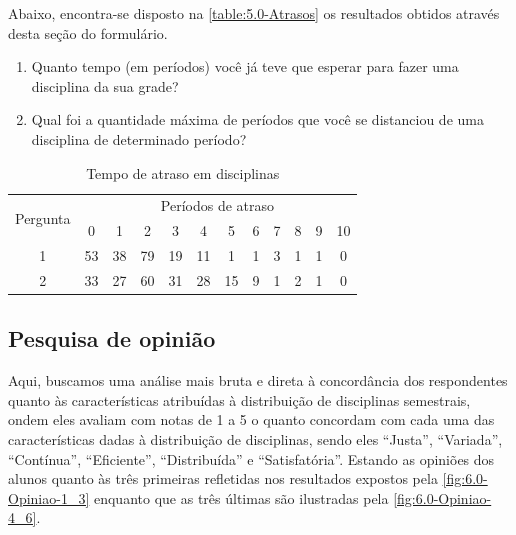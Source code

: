 Abaixo, encontra-se disposto na \autoref{table:5.0-Atrasos} os resultados obtidos através desta seção do formulário.

\begin{enumerate}
  \item Quanto tempo (em períodos) você já teve que esperar para fazer uma disciplina da sua grade?
  \item Qual foi a quantidade máxima de períodos que você se distanciou de uma disciplina de determinado período?
\end{enumerate}

\begin{table}[htbp]\centering
  \caption{Tempo de atraso em disciplinas}
  \label{table:5.0-Atrasos}
  \begin{tabular}{| c | c c c c c c c c c c c |}
    \hline
    \multicolumn{1}{|c|}{\multirow{2}{*}{Pergunta}} &
    \multicolumn{11}{c|}{Períodos de atraso}                                                          \\
    \multicolumn{1}{|c|}{}                          &
    \multicolumn{1}{c|}{0}                          &
    \multicolumn{1}{c|}{1}                          &
    \multicolumn{1}{c|}{2}                          &
    \multicolumn{1}{c|}{3}                          &
    \multicolumn{1}{c|}{4}                          &
    \multicolumn{1}{c|}{5}                          &
    \multicolumn{1}{c|}{6}                          &
    \multicolumn{1}{c|}{7}                          &
    \multicolumn{1}{c|}{8}                          &
    \multicolumn{1}{c|}{9}                          &
    \multicolumn{1}{|c|}{10}
    \\
    \hline
    1                                               & 53 & 38 & 79 & 19 & 11 & 1  & 1 & 3 & 1 & 1 & 0 \\
    2                                               & 33 & 27 & 60 & 31 & 28 & 15 & 9 & 1 & 2 & 1 & 0 \\
    \hline
  \end{tabular}
\end{table}

\subsection{Pesquisa de opinião} %

Aqui, buscamos uma análise mais bruta e direta à concordância dos respondentes quanto às características atribuídas à distribuição de disciplinas semestrais, ondem eles avaliam com notas de 1 a 5 o quanto concordam com cada uma das características dadas à distribuição de disciplinas, sendo eles ``Justa'', ``Variada'', ``Contínua'', ``Eficiente'', ``Distribuída'' e ``Satisfatória''. Estando as opiniões dos alunos quanto às três primeiras refletidas nos resultados expostos pela \autoref{fig:6.0-Opiniao-1_3} enquanto que as três últimas são ilustradas pela \autoref{fig:6.0-Opiniao-4_6}.

